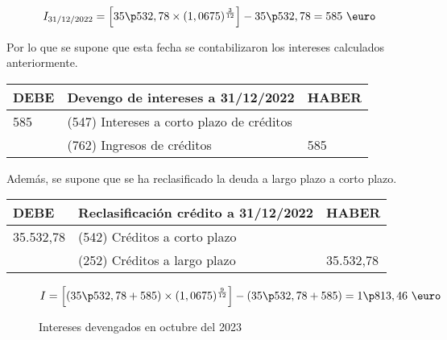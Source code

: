 \begin{enumerate}[label=\textbf{\alph*})]
        \begin{equation*}
            I_{\text{31/12/2022}} = \left[35\p532,78 \times (1,0675)^{\frac{3}{12}}\right] - 35\p532,78 = 585 \text{ \euro}
        \end{equation*}

        Por lo que se supone que esta fecha se contabilizaron los intereses calculados anteriormente.

        \begin{table}[H]
            \centering
            \begin{tabular}{|p{3cm}|p{6cm}|p{3cm}|}
            \hline
            \rowcolor{blue!30}
            \textbf{DEBE} & \textbf{Devengo de intereses a 31/12/2022} & \textbf{HABER} \\
            \hline
            585 & (547) Intereses a corto plazo de créditos & \\
            \hline
            & (762) Ingresos de créditos & 585 \\
            \hline
            \end{tabular}
        \end{table}

        Además, se supone que se ha reclasificado la deuda a largo plazo a corto plazo.

        \begin{table}[H]
            \centering
            \begin{tabular}{|p{3cm}|p{6cm}|p{3cm}|}
            \hline
            \rowcolor{blue!30}
            \textbf{DEBE} & \textbf{Reclasificación crédito a 31/12/2022} & \textbf{HABER} \\
            \hline
            35.532,78 & (542) Créditos a corto plazo & \\
            \hline
            & (252) Créditos a largo plazo & 35.532,78 \\
            \hline
            \end{tabular}
        \end{table}

        \begin{figure}[H]
            \begin{equation*}
                I = \left[(35\p532,78 + 585) \times (1,0675)^{\frac{9}{12}}\right] - (35\p532,78 + 585) = 1\p813,46 \text{ \euro}  
            \end{equation*}
            \caption{Intereses devengados en octubre del 2023}
        \end{figure} 


\end{enumerate}
